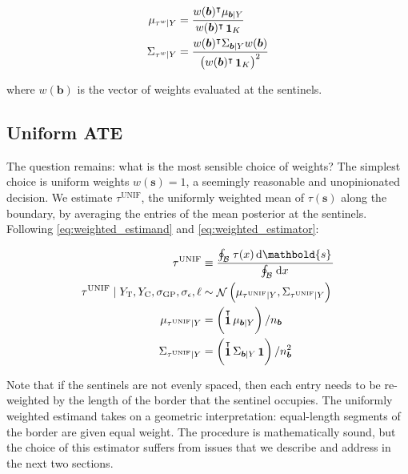 \documentclass[letter]{article}
\DeclareMathOperator{\normal}{\mathcal{N}}
\DeclareMathOperator{\ones}{\mathbf{1}}
\newcommand{\trans}{^{\intercal}}
\newcommand{\treat}{\mathrm{T}}
\newcommand{\ctrol}{\mathrm{C}}
\newcommand{\sigmaf}{\sigma_{\mathrm{GP}}}
\newcommand{\sigman}{\sigma_{\epsilon}}
\newcommand{\svec}{\mathbold{s}}
\newcommand{\boundary}{\mathcal{B}}
\newcommand{\sentinels}{\bm{b}}
\newcommand{\tauw}{\tau^{w}}
\newcommand{\unifavg}{\tau^{\mathrm{UNIF}}}
\newcommand{\eqlabel}[1]{\label{#1}}
\newcommand{\numsent}{n_{\sentinels}}
\begin{document}
\begin{equation}\begin{split}
    \mu_{\tauw \mid Y} &= \frac{w(\sentinels)\trans \mu_{\sentinels \mid Y}}
                               {w(\sentinels)\trans  \ones_K} \\
    \Sigma_{\tauw \mid Y} &= \frac{w(\sentinels)\trans \Sigma_{\sentinels \mid Y} w(\sentinels)}
                                  { \del{w(\sentinels)\trans  \ones_K }^2 }\\
\end{split}
\eqlabel{eq:weighted_estimator}
\end{equation}

where \(w(\sentinels)\) is the vector of weights evaluated at the sentinels.
    


    	\subsection{Uniform ATE}\label{uniform-ate}

The question remains: what is the most sensible choice of weights?
The simplest choice is uniform weights \(w(\svec)=1\), a seemingly reasonable and unopinionated decision.
We estimate \(\unifavg\), the uniformly weighted mean of \(\tau(\svec)\) along the boundary, by averaging the entries of the mean posterior at the sentinels.
Following \eqref{eq:weighted_estimand} and \eqref{eq:weighted_estimator}:

\begin{equation}\begin{split}
    \unifavg &\equiv \frac{\oint_\boundary \left. \tau(x) \dif \svec \right.}
                          {\oint_\boundary \left. \dif x \right.} \\
    \unifavg \mid Y_\treat{}, Y_\ctrol{}, \sigmaf, \sigman, \ell &\sim \normal\del{\mu_{\unifavg \mid Y}, \Sigma_{\unifavg \mid Y}} \\
    \mu_{\unifavg \mid Y} &= \del{\ones\trans \mu_{\sentinels \mid Y}} / \numsent \\
    \Sigma_{\unifavg \mid Y} &= \del{\ones\trans \Sigma_{\sentinels \mid Y} \ones} / \numsent^2
\end{split}
\eqlabel{eq:unifavg}
\end{equation}

Note that if the sentinels are not evenly spaced, then each entry needs to be re-weighted by the length of the border that the sentinel occupies.
The uniformly weighted estimand takes on a geometric interpretation: equal-length segments of the border are given equal weight.
The procedure is mathematically sound, but the choice of this estimator suffers from issues that we describe and address in the next two sections.
    
\end{document}
